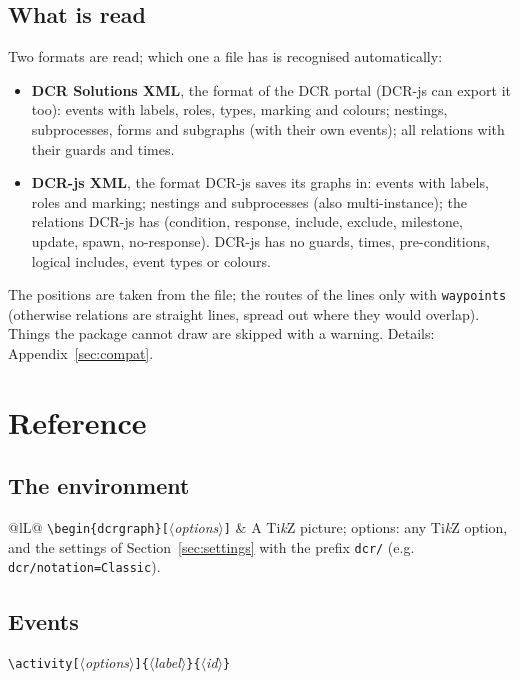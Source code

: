 \documentclass[a4paper,11pt]{article}
\newcommand\cs[1]{\texttt{\textbackslash#1}}
\newcommand\key[1]{\texttt{#1}}
\newcommand\meta[1]{\ensuremath{\langle}\textit{#1}\ensuremath{\rangle}}
\newcommand\marg[1]{\texttt{\{}\meta{#1}\texttt{\}}}
\newcommand\oarg[1]{\texttt{[}\meta{#1}\texttt{]}}
\begin{document}
\subsection{What is read}
Two formats are read; which one a file has is recognised automatically:
\begin{itemize}
  \item \textbf{DCR Solutions XML}, the format of the DCR portal (DCR-js can
    export it too): events with labels, roles, types, marking and colours;
    nestings, subprocesses, forms and subgraphs (with their own events); all
    relations with their guards and times.
  \item \textbf{DCR-js XML}, the format DCR-js saves its graphs in: events
    with labels, roles and marking; nestings and subprocesses (also
    multi-instance); the relations DCR-js has (condition, response, include,
    exclude, milestone, update, spawn, no-response). DCR-js has no guards,
    times, pre-conditions, logical includes, event types or colours.
\end{itemize}
The positions are taken from the file; the routes of the lines only with
\key{waypoints} (otherwise relations are straight lines, spread out where
they would overlap). Things the package cannot draw are skipped with a
warning. Details: Appendix~\ref{sec:compat}.

\section{Reference}

\subsection{The environment}
\begin{tabularx}{\linewidth}{@{}lL@{}}
\toprule
\cs{begin\{dcrgraph\}}\oarg{options} & A Ti\emph{k}Z picture; options:
  any Ti\emph{k}Z option, and the settings of Section~\ref{sec:settings} with
  the prefix \key{dcr/} (e.g. \key{dcr/notation=Classic}).\\
\bottomrule
\end{tabularx}

\subsection{Events}
\cs{activity}\oarg{options}\marg{label}\marg{id}
\end{document}
